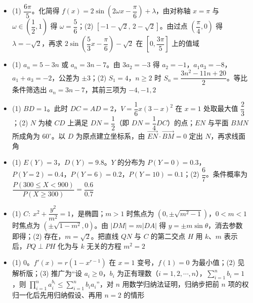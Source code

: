 \begin{itemize}[leftmargin=2.6em]
  \item[\textbf{17.}] (1) $\dfrac{6\pi}{5}$。化简得 $f(x)=2\sin\left(2\omega x-\dfrac\pi6\right)+\lambda$，由对称轴 $x=\pi$ 与 $\omega\in\left(\dfrac12,1\right)$ 得 $\omega=\dfrac56$；(2) $\left[-1-\sqrt2,\,2-\sqrt2\right]$。由过点 $\left(\dfrac\pi4,0\right)$ 得 $\lambda=-\sqrt2$，再求 $2\sin\left(\dfrac53x-\dfrac\pi6\right)-\sqrt2$ 在 $\left[0,\dfrac{3\pi}5\right]$ 上的值域
  \item[\textbf{18.}] (1) $a_n=5-3n$ 或 $a_n=3n-7$。由 $3a_2=-3$ 得 $a_2=-1$，$a_1a_3=-8$，$a_1+a_3=-2$，公差为 $\pm3$；(2) $S_1=4$，$n\geqslant2$ 时 $S_n=\dfrac{3n^2-11n+20}{2}$。等比条件筛选出 $a_n=3n-7$，其前三项为 $-4,-1,2$
  \item[\textbf{19.}] (1) $BD=1$。此时 $DC=AD=2$，$V=\dfrac16x(3-x)^2$ 在 $x=1$ 处取最大值 $\dfrac23$；(2) $N$ 为棱 $CD$ 上满足 $DN=\dfrac12$（即 $DN=\dfrac14DC$）的点；$EN$ 与平面 $BMN$ 所成角为 $60^\circ$。以 $D$ 为原点建立坐标系，由 $\overrightarrow{EN}\cdot\overrightarrow{BM}=0$ 定出 $N$，再求线面角
  \item[\textbf{20.}] (1) $E(Y)=3$，$D(Y)=9.8$。$Y$ 的分布为 $P(Y=0)=0.3$，$P(Y=2)=0.4$，$P(Y=6)=0.2$，$P(Y=10)=0.1$；(2) $\dfrac67$。条件概率为 $\dfrac{P(300\leqslant X<900)}{P(X\geqslant300)}=\dfrac{0.6}{0.7}$
  \item[\textbf{21.}] (1) $C:\ x^2+\dfrac{y^2}{m^2}=1$，是椭圆；$m>1$ 时焦点为 $\left(0,\pm\sqrt{m^2-1}\right)$，$0<m<1$ 时焦点为 $\left(\pm\sqrt{1-m^2},0\right)$。由 $|DM|=m|DA|$ 得 $y=\pm m\sin\theta$，消去参数即得；(2) 存在，$m=\sqrt2$。把直线 $QN$ 与 $C$ 的第二交点 $H$ 用 $k$、$m$ 表示后，$PQ\perp PH$ 化为与 $k$ 无关的方程 $m^2=2$
  \item[\textbf{22.}] (1) $0$。$f'(x)=r\left(1-x^{r-1}\right)$ 在 $x=1$ 变号，$f(1)=0$ 为最小值；(2) 见解析版；(3) 推广为“设 $a_i\geqslant0$，$b_i$ 为正有理数（$i=1,2,\cdots,n$），$\sum\limits_{i=1}^n b_i=1$，则 $\prod\limits_{i=1}^n a_i^{b_i}\leqslant\sum\limits_{i=1}^n b_i a_i$”，对 $n$ 用数学归纳法证明，归纳步把前 $n$ 项的权归一化后先用归纳假设、再用 $n=2$ 的情形
\end{itemize}
